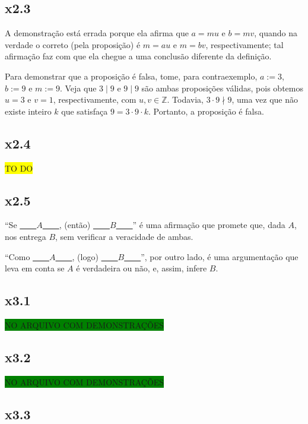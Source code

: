 \documentclass[portuguese,a4paper,12pt]{article}
\begin{document}
	\subsection*{x2.3}
	
	A demonstração está errada porque ela afirma que $a = mu$ e $b = mv$, quando na verdade o correto (pela proposição) é $m = au$ e $m = bv$, respectivamente; tal afirmação faz com que ela chegue a uma conclusão diferente da definição.
	
	Para demonstrar que a proposição é falsa, tome, para contraexemplo, $a := 3$, $b := 9$ e $m := 9$. Veja que $3 \mid 9$ e $9 \mid 9$ são ambas proposições válidas, pois obtemos $u = 3$ e $v = 1$, respectivamente, com $u, v \in \mathbb{Z}$. Todavia, $3 \cdot 9 \nmid 9$, uma vez que não existe inteiro $k$ que satisfaça $9 = 3 \cdot 9 \cdot k$. Portanto, a proposição é falsa.
	
	\subsection*{x2.4}
	
	\colorbox{yellow}{TO DO}
	
	\subsection*{x2.5}
	
	``Se \underline{\ \ \ \ }$A$\underline{\ \ \ \ }, (então) \underline{\ \ \ \ }$B$\underline{\ \ \ \ }'' é uma afirmação que promete que, dada $A$, nos entrega $B$, sem verificar a veracidade de ambas.
	
	``Como \underline{\ \ \ \ }$A$\underline{\ \ \ \ }, (logo) \underline{\ \ \ \ }$B$\underline{\ \ \ \ }'', por outro lado, é uma argumentação que leva em conta se $A$ é verdadeira ou não, e, assim, infere $B$.
	
	\subsection*{x3.1}
	
	\colorbox{green}{NO ARQUIVO COM DEMONSTRAÇÕES}
	
	\subsection*{x3.2}
	
	\colorbox{green}{NO ARQUIVO COM DEMONSTRAÇÕES}
	
	\subsection*{x3.3}
	
\end{document}
